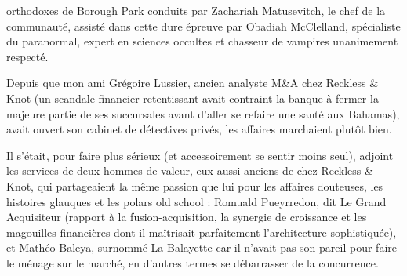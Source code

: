 orthodoxes de Borough Park conduits par Zachariah Matusevitch, le chef de la communauté, assisté dans cette dure épreuve par Obadiah McClelland, spécialiste du paranormal, expert en sciences occultes et chasseur de vampires unanimement respecté.

%

\scene

Depuis que mon ami Grégoire Lussier, ancien analyste M\&A chez Reckless \& Knot (un scandale financier retentissant avait contraint la banque à fermer la majeure partie de ses succursales avant d’aller se refaire une santé aux Bahamas), avait ouvert son cabinet de détectives privés, les affaires marchaient plutôt bien.

Il s’était, pour faire plus sérieux (et accessoirement se sentir moins seul), adjoint les services de deux hommes de valeur, eux aussi anciens de chez Reckless \& Knot, qui partageaient la même passion que lui pour les affaires douteuses, les histoires glauques et les polars old school : Romuald Pueyrredon, dit Le Grand Acquisiteur (rapport à la fusion-acquisition, la synergie de croissance et les magouilles financières dont il maîtrisait parfaitement l’architecture sophistiquée), et Mathéo Baleya, surnommé La Balayette car il n’avait pas son pareil pour faire le ménage sur le marché, en d’autres termes se débarrasser de la concurrence.

